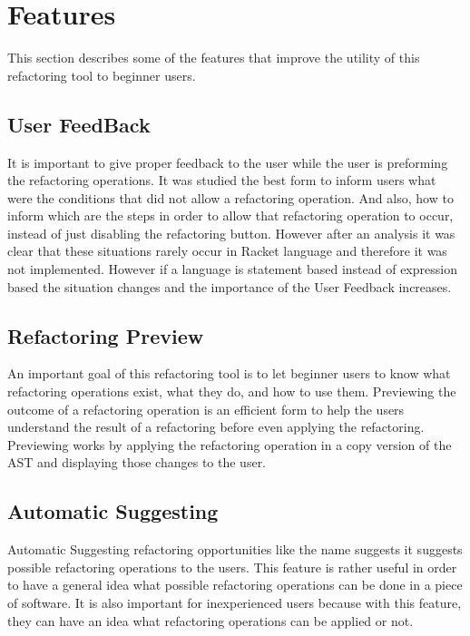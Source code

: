 \section{Features}
This section describes some of the features that improve the utility of this
refactoring tool to beginner users. %
\subsection{User FeedBack}
It is important to give proper feedback to the user while the user is preforming
the refactoring operations.
It was studied the best form to inform users what were the conditions that did not allow %
a refactoring operation.
And also, how to inform which are the steps in order to allow that refactoring operation to occur,
instead of just disabling the refactoring button.
However after an analysis it was clear that these situations rarely occur
in Racket language and therefore it was not implemented.
However if a language is statement based instead of expression based the situation changes
and the importance of the User Feedback increases. %

\subsection{Refactoring Preview}
An important goal of this refactoring tool is to let beginner users to know what
refactoring operations exist, what they do, and how to use them.
Previewing the outcome of a refactoring operation is an efficient form to
help the users understand the result of a refactoring before even applying the refactoring. %
Previewing works by applying the refactoring operation in a copy version of the AST
and displaying those changes to the user.


\subsection{Automatic Suggesting}
Automatic Suggesting refactoring opportunities like the name suggests it suggests
possible refactoring operations to the users.
This feature is rather useful in order to have a general idea what possible refactoring
operations can be done in a piece of software. %
It is also important for inexperienced users because with this feature,
they can have an idea what refactoring operations can be applied or not.


